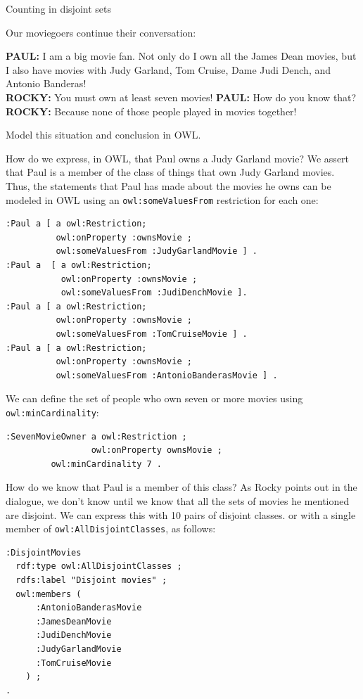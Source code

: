 \begin{challenge}{Counting in disjoint sets}
\label{chal:36}

Our moviegoers continue their conversation:

\noindent\textbf{PAUL:} I am a big movie fan. Not only do I own all the James Dean
movies, but I also have movies with Judy Garland, Tom Cruise, Dame Judi
Dench, and Antonio Banderas! \\
\textbf{ROCKY:} You must own at least seven movies! 
\textbf{PAUL:} How do you know that? \\
\textbf{ROCKY:} Because none of those people played in movies together!

Model this situation and conclusion in OWL.

\solution

How do we express, in OWL, that Paul owns a Judy Garland movie? We
assert that Paul is a member of the class of things that own Judy
Garland movies. Thus, the statements that Paul has made about the movies
he owns can be modeled in OWL using an \texttt{owl:someValuesFrom} restriction
for each one:

\begin{lstlisting}
:Paul a [ a owl:Restriction;
          owl:onProperty :ownsMovie ;
          owl:someValuesFrom :JudyGarlandMovie ] .
:Paul a  [ a owl:Restriction;
           owl:onProperty :ownsMovie ;
           owl:someValuesFrom :JudiDenchMovie ].
:Paul a [ a owl:Restriction;
          owl:onProperty :ownsMovie ;
          owl:someValuesFrom :TomCruiseMovie ] .
:Paul a [ a owl:Restriction;
          owl:onProperty :ownsMovie ;
          owl:someValuesFrom :AntonioBanderasMovie ] .
\end{lstlisting}

We can define the set of people who own seven or more movies using
\texttt{owl:minCardinality}:

\begin{lstlisting}
:SevenMovieOwner a owl:Restriction ; 
                 owl:onProperty ownsMovie ;
		 owl:minCardinality 7 .
\end{lstlisting}

How do we know that Paul is a member of this class? As Rocky points out
in the dialogue, we don't know until we know that all the sets of movies
he mentioned are disjoint. We can express this with 10 pairs of disjoint classes. or with a
single member of \texttt{owl:AllDisjointClasses}, as follows:

\begin{lstlisting}
:DisjointMovies
  rdf:type owl:AllDisjointClasses ;
  rdfs:label "Disjoint movies" ;
  owl:members (
      :AntonioBanderasMovie
      :JamesDeanMovie
      :JudiDenchMovie
      :JudyGarlandMovie
      :TomCruiseMovie
    ) ;
.
\end{lstlisting}



\end{challenge}

